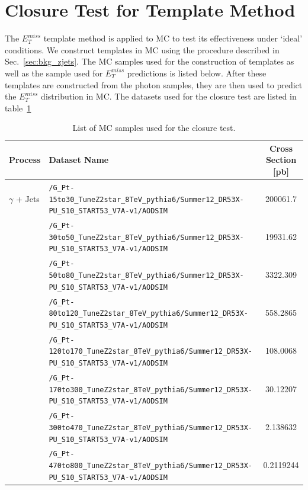 \clearpage
\section{Closure Test for Template Method}
\label{sec:templateclosure}

The $E^{miss}_T$ template method is applied to MC to test its effectiveness under ‘ideal’ conditions. We construct
templates in MC using the procedure described in Sec.~\ref{sec:bkg_zjets}. The MC samples used for the construction of templates as well
as the sample used for $E^{miss}_T$  predictions is listed below. After these templates are constructed from the photon samples, 
they are then used to predict the $E^{miss}_T$ distribution in \zjets MC. The datasets used for the closure test are listed in table~\ref{tab:closuremc}

\begin{table}[htb]                                                                                                                                                              
\begin{center}                                                                                                                                                
\scriptsize
\caption{\label{tab:closuremc} List of MC samples used for the closure test.}
\begin{tabular}{l|l|c}  
\hline
\hline
Process & Dataset Name & Cross Section [pb] \\
\hline
$\gamma$ + Jets & \verb=/G_Pt-15to30_TuneZ2star_8TeV_pythia6/Summer12_DR53X-PU_S10_START53_V7A-v1/AODSIM= & 200061.7 \\
 & \verb=/G_Pt-30to50_TuneZ2star_8TeV_pythia6/Summer12_DR53X-PU_S10_START53_V7A-v1/AODSIM= & 19931.62 \\
 & \verb=/G_Pt-50to80_TuneZ2star_8TeV_pythia6/Summer12_DR53X-PU_S10_START53_V7A-v1/AODSIM= & 3322.309 \\
 & \verb=/G_Pt-80to120_TuneZ2star_8TeV_pythia6/Summer12_DR53X-PU_S10_START53_V7A-v1/AODSIM= & 558.2865 \\
 & \verb=/G_Pt-120to170_TuneZ2star_8TeV_pythia6/Summer12_DR53X-PU_S10_START53_V7A-v1/AODSIM= & 108.0068 \\
 & \verb=/G_Pt-170to300_TuneZ2star_8TeV_pythia6/Summer12_DR53X-PU_S10_START53_V7A-v1/AODSIM= & 30.12207 \\
 & \verb=/G_Pt-300to470_TuneZ2star_8TeV_pythia6/Summer12_DR53X-PU_S10_START53_V7A-v1/AODSIM= & 2.138632 \\
 & \verb=/G_Pt-470to800_TuneZ2star_8TeV_pythia6/Summer12_DR53X-PU_S10_START53_V7A-v1/AODSIM= & 0.2119244 \\

\end{tabular}
\end{center}
\end{table}
